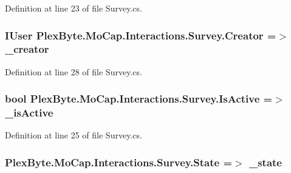 Definition at line 23 of file Survey.\+cs.

\subsubsection[{\texorpdfstring{Creator}{Creator}}]{\setlength{\rightskip}{0pt plus 5cm}I\+User Plex\+Byte.\+Mo\+Cap.\+Interactions.\+Survey.\+Creator =$>$ \+\_\+creator}\hypertarget{class_plex_byte_1_1_mo_cap_1_1_interactions_1_1_survey_af2a84b3a5f615138e34cda5b24f30cfd}{}\label{class_plex_byte_1_1_mo_cap_1_1_interactions_1_1_survey_af2a84b3a5f615138e34cda5b24f30cfd}


Definition at line 28 of file Survey.\+cs.

\subsubsection[{\texorpdfstring{Is\+Active}{IsActive}}]{\setlength{\rightskip}{0pt plus 5cm}bool Plex\+Byte.\+Mo\+Cap.\+Interactions.\+Survey.\+Is\+Active =$>$ \+\_\+is\+Active}\hypertarget{class_plex_byte_1_1_mo_cap_1_1_interactions_1_1_survey_aea8262119dda55b23d594cbadc4bb1d8}{}\label{class_plex_byte_1_1_mo_cap_1_1_interactions_1_1_survey_aea8262119dda55b23d594cbadc4bb1d8}


Definition at line 25 of file Survey.\+cs.

\subsubsection[{\texorpdfstring{State}{State}}]{ Plex\+Byte.\+Mo\+Cap.\+Interactions.\+Survey.\+State =$>$ \+\_\+state}\hypertarget{class_plex_byte_1_1_mo_cap_1_1_interactions_1_1_survey_abd3fc51c6adfad7a540c70512303e280}{}\label{class_plex_byte_1_1_mo_cap_1_1_interactions_1_1_survey_abd3fc51c6adfad7a540c70512303e280}


